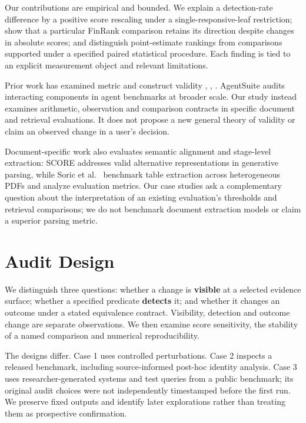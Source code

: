 \documentclass[runningheads]{llncs}
\begin{document}
Our contributions are empirical and bounded. We explain a detection-rate
difference by a positive score rescaling under a single-responsive-leaf
restriction; show that a particular FinRank comparison retains its
direction despite changes in absolute scores; and distinguish
point-estimate rankings from comparisons supported under a specified
paired statistical procedure. Each finding is tied to an explicit
measurement object and relevant limitations.

Prior work has examined metric and construct validity \cite{r3},
\cite{r4}, \cite{r5}. AgentSuite \cite{r6} audits interacting components
in agent benchmarks at broader scale. Our study instead examines
arithmetic, observation and comparison contracts in specific document
and retrieval evaluations. It does not propose a new general theory of
validity or claim an observed change in a user's decision.

Document-specific work also evaluates semantic alignment and stage-level
extraction: SCORE \cite{r7} addresses valid alternative representations
in generative parsing, while Soric et al.~\cite{r8} benchmark table
extraction across heterogeneous PDFs and analyze evaluation metrics. Our
case studies ask a complementary question about the interpretation of an
existing evaluation's thresholds and retrieval comparisons; we do not
benchmark document extraction models or claim a superior parsing metric.

\section{Audit Design}\label{audit-design}

We distinguish three questions: whether a change is \textbf{visible} at
a selected evidence surface; whether a specified predicate
\textbf{detects} it; and whether it changes an outcome under a stated
equivalence contract. Visibility, detection and outcome change are
separate observations. We then examine score sensitivity, the stability
of a named comparison and numerical reproducibility.

The designs differ. Case 1 uses controlled perturbations. Case 2
inspects a released benchmark, including source-informed post-hoc
identity analysis. Case 3 uses researcher-generated systems and test
queries from a public benchmark; its original audit choices were not
independently timestamped before the first run. We preserve fixed
outputs and identify later explorations rather than treating them as
prospective confirmation.
\end{document}
